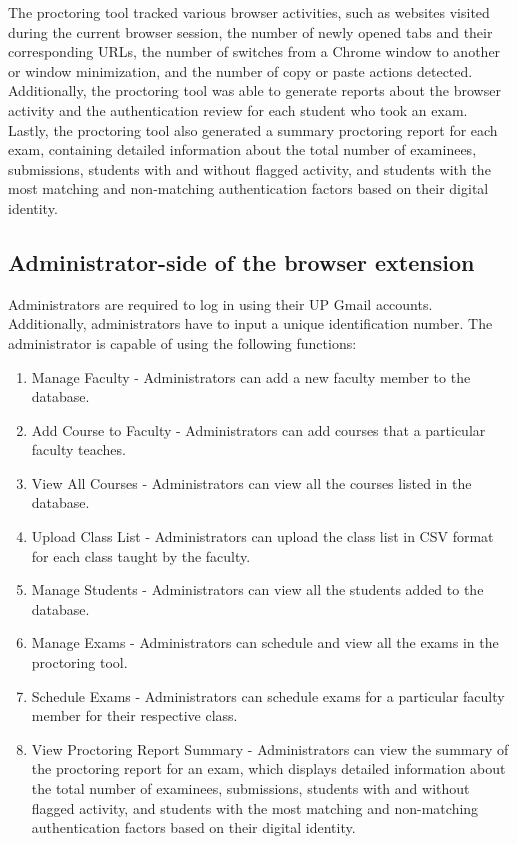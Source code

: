 \documentclass{icsthesis}
\begin{document}
\begin{mainmatter}
The proctoring tool tracked various browser activities, such as websites visited during the current browser session, the number of newly opened tabs and their corresponding URLs, the number of switches from a Chrome window to another or window minimization, and the number of copy or paste actions detected. Additionally, the proctoring tool was able to generate reports about the browser activity and the authentication review for each student who took an exam. Lastly, the proctoring tool also generated a summary proctoring report for each exam, containing detailed information about the total number of examinees, submissions, students with and without flagged activity, and students with the most matching and non-matching authentication factors based on their digital identity.

\subsection{Administrator-side of the browser extension}
Administrators are required to log in using their UP Gmail accounts. Additionally, administrators have to input a unique identification number. The administrator is capable of using the following functions:
 \begin{enumerate}
    \item Manage Faculty - Administrators can add a new faculty member to the database.
    \item Add Course to Faculty - Administrators can add courses that a particular faculty teaches.
    \item View All Courses - Administrators can view all the courses listed in the database.
    \item Upload Class List - Administrators can upload the class list in CSV format for each class taught by the faculty.
    \item Manage Students - Administrators can view all the students added to the database.
    \item Manage Exams - Administrators can schedule and view all the exams in the proctoring tool.
    \item Schedule Exams - Administrators can schedule exams for a particular faculty member for their respective class.
    \item View Proctoring Report Summary - Administrators can view the summary of the proctoring report for an exam, which displays detailed information about the total number of examinees, submissions, students with and without flagged activity, and students with the most matching and non-matching authentication factors based on their digital identity.

\end{enumerate}
\end{mainmatter}
\end{document}
